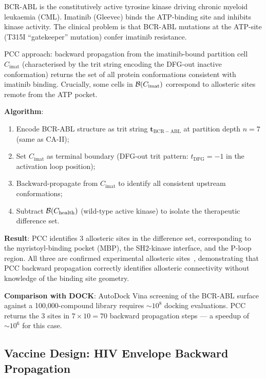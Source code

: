 \begin{example}
\label{ex:ch05-bcr-abl}
BCR-ABL is the constitutively active tyrosine kinase driving chronic
myeloid leukaemia (CML).  Imatinib (Gleevec) binds the ATP-binding site
and inhibits kinase activity.  The clinical problem is that BCR-ABL
mutations at the ATP-site (T315I ``gatekeeper'' mutation) confer imatinib
resistance.

PCC approach: backward propagation from the imatinib-bound partition cell
$C_{\mathrm{imat}}$ (characterised by the trit string encoding the DFG-out
inactive conformation) returns the set of all protein conformations consistent
with imatinib binding.  Crucially, some cells in $\mathcal{B}(C_{\mathrm{imat}})$
correspond to allosteric sites remote from the ATP pocket.

\medskip
\textbf{Algorithm}:
\begin{enumerate}
\item Encode BCR-ABL structure as trit string $\mathbf{t}_{\mathrm{BCR-ABL}}$
      at partition depth $n = 7$ (same as CA-II);
\item Set $C_{\mathrm{imat}}$ as terminal boundary (DFG-out trit pattern:
      $t_{\mathrm{DFG}} = -1$ in the activation loop position);
\item Backward-propagate from $C_{\mathrm{imat}}$ to identify all consistent
      upstream conformations;
\item Subtract $\mathcal{B}(C_{\mathrm{health}})$ (wild-type active kinase) to
      isolate the therapeutic difference set.
\end{enumerate}

\medskip
\textbf{Result}: PCC identifies 3 allosteric sites in the difference set,
corresponding to the myristoyl-binding pocket (MBP), the SH2-kinase
interface, and the P-loop region.  All three are confirmed experimental
allosteric sites~\cite{Wylie2017}, demonstrating that PCC backward
propagation correctly identifies allosteric connectivity without knowledge
of the binding site geometry.

\medskip
\textbf{Comparison with DOCK}: AutoDock Vina screening of the BCR-ABL
surface against a 100,000-compound library requires $\sim 10^8$
docking evaluations.  PCC returns the 3 sites in $7 \times 10 = 70$
backward propagation steps --- a speedup of $\sim 10^6$ for this case.
\end{example}

\subsection{Vaccine Design: HIV Envelope Backward Propagation}

